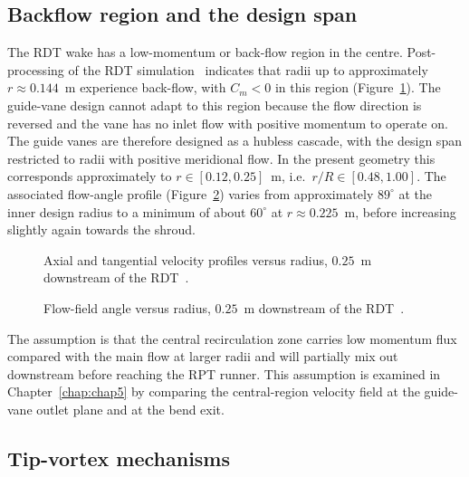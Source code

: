\subsection{Backflow region and the design span}
\label{sec:theory_backflow_span}
 
The RDT wake has a low-momentum or back-flow region in the centre. Post-processing of the RDT simulation~\cite{DjupeslandTrivedi2025} indicates that radii up to approximately $r \approx 0.144$~m experience back-flow, with $C_m < 0$ in this region (Figure~\ref{fig:UxUt}). The guide-vane design cannot adapt to this region because the flow direction is reversed and the vane has no inlet flow with positive momentum to operate on. The guide vanes are therefore designed as a hubless cascade, with the design span restricted to radii with positive meridional flow. In the present geometry this corresponds approximately to $r \in [0.12, 0.25]$~m, i.e.\ $r/R \in [0.48, 1.00]$. The associated flow-angle profile (Figure~\ref{fig:AngleRadius}) varies from approximately $89^\circ$ at the inner design radius to a minimum of about $60^\circ$ at $r \approx 0.225$~m, before increasing slightly again towards the shroud.
 
\begin{figure}[h!]
    \centering
    
    \caption[Axial and tangential velocity profiles]{Axial and tangential velocity profiles versus radius, $0.25$~m downstream of the RDT~\cite{DjupeslandTrivedi2025}.}
    \label{fig:UxUt}
\end{figure}
\begin{figure}[h!]
    \centering
    
    \caption[Flow-field angle]{Flow-field angle versus radius, $0.25$~m downstream of the RDT~\cite{DjupeslandTrivedi2025}.}
    \label{fig:AngleRadius}
\end{figure}
 
The assumption is that the central recirculation zone carries low momentum flux compared with the main flow at larger radii and will partially mix out downstream before reaching the RPT runner. This assumption is examined in Chapter~\ref{chap:chap5} by comparing the central-region velocity field at the guide-vane outlet plane and at the bend exit.
 
\subsection{Tip-vortex mechanisms}
\label{sec:theory_tip_vortex}
 
